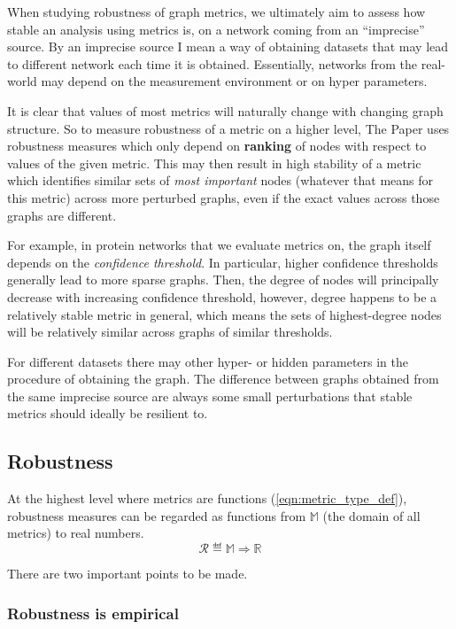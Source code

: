 When studying robustness of graph metrics, we ultimately aim to assess how stable an analysis using metrics is, on a network coming from an ``imprecise'' source.
By an imprecise source I mean a way of obtaining datasets that may lead to different network each time it is obtained.
Essentially, networks from the real-world may depend on the measurement environment or on hyper parameters.

It is clear that values of most metrics will naturally change with changing graph structure.
So to measure robustness of a metric on a higher level, The Paper uses robustness measures which only depend on \textbf{ranking} of nodes with respect to values of the given metric.
This may then result in high stability of a metric which identifies similar sets of \textsl{most important} nodes (whatever that means for this metric) across more perturbed graphs, even if the exact values across those graphs are different.

\parspace

For example, in protein networks that we evaluate metrics on, the graph itself depends on the \textsl{confidence threshold}.
In particular, higher confidence thresholds generally lead to more sparse graphs.
Then, the degree of nodes will principally decrease with increasing confidence threshold, however, degree happens to be a relatively stable metric in general, which means the sets of highest-degree nodes will be relatively similar across graphs of similar thresholds.

For different datasets there may other hyper- or hidden parameters in the procedure of obtaining the graph.
The difference between graphs obtained from the same imprecise source are always some small perturbations that stable metrics should ideally be resilient to.

\subsection{Robustness}

At the highest level where metrics are functions (\autoref{eqn:metric_type_def}), robustness measures can be regarded as functions from $\mathbb{M}$ (the domain of all metrics) to real numbers.
\begin{equation}
    \mathcal{R} \eqdef \mathbb{M} \Rightarrow \mathbb{R}
\end{equation}

There are two important points to be made.

\subsubsection*{Robustness is empirical}

